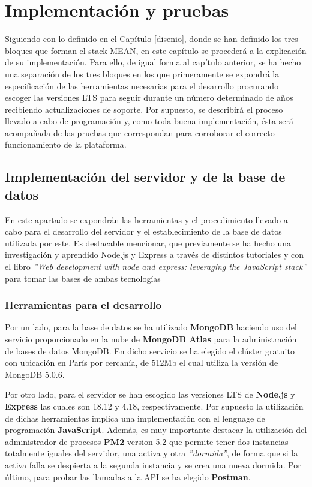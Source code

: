 \chapter{Implementación y pruebas}
Siguiendo con lo definido en el Capítulo \ref{disenio}, donde se han definido los tres bloques que forman el stack MEAN, en este capítulo se procederá a la explicación de su implementación. Para ello, de igual forma al capítulo anterior, se ha hecho una separación de los tres bloques en los que primeramente se expondrá la especificación de las herramientas necesarias para el desarrollo procurando escoger las versiones LTS para seguir durante un número determinado de años recibiendo actualizaciones de soporte. Por supuesto, se describirá el proceso llevado a cabo de programación y, como toda buena implementación, ésta será acompañada de las pruebas que correspondan para corroborar el correcto funcionamiento de la plataforma.

\section{Implementación del servidor y de la base de datos} \label{implementacion-server}
En este apartado se expondrán las herramientas y el procedimiento llevado a cabo para el desarrollo del servidor y el establecimiento de la base de datos utilizada por este. Es destacable mencionar, que previamente se ha hecho una investigación y aprendido Node.js y Express a través de distintos tutoriales y con el libro \textit{''Web development with node and express: leveraging the JavaScript stack''} para tomar las bases de ambas tecnologías \cite{brown2019web}

\subsection{Herramientas para el desarrollo}
Por un lado, para la base de datos se ha utilizado \textbf{MongoDB} haciendo uso del servicio proporcionado en la nube de \textbf{MongoDB Atlas} para la administración de bases de datos MongoDB. En dicho servicio se ha elegido el clúster gratuito con ubicación en París por cercanía, de 512Mb el cual utiliza la versión de MongoDB 5.0.6. 

Por otro lado, para el servidor se han escogido las versiones LTS de \textbf{Node.js} y \textbf{Express} las cuales son 18.12 y 4.18, respectivamente. Por supuesto la utilización de dichas herramientas implica una implementación con el lenguage de programación \textbf{JavaScript}. Además, es muy importante destacar la utilización del administrador de procesos \textbf{PM2} version 5.2 que permite tener dos instancias totalmente iguales del servidor, una activa y otra \textit{''dormida''}, de forma que si la activa falla se despierta a la segunda instancia y se crea una nueva dormida. Por último, para probar las llamadas a la API se ha elegido \textbf{Postman}.

